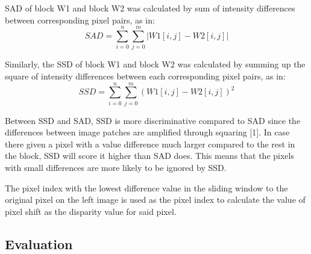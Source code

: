 \documentclass[conference]{IEEEtran}
\begin{document}
SAD of block W1 and block W2 was calculated by sum of intensity differences between corresponding pixel pairs, as in:
\begin{equation*}
    SAD=\sum^{n}_{i=0}\sum^{m}_{j=0}|W1[i,j]-W2[i,j]|
\end{equation*}

Similarly, the SSD of block W1 and block W2 was calculated by summing up the square of intensity differences between each corresponding pixel pairs, as in:
\begin{equation*}
    SSD=\sum^{n}_{i=0}\sum^{m}_{j=0}(W1[i,j]-W2[i,j])^2
\end{equation*}

Between SSD and SAD, SSD is more discriminative compared to SAD since the differences between image patches are amplified through squaring [1]. In case there given a pixel with a value difference much larger compared to the rest in the block, SSD will score it higher than SAD does. This means that the pixels with small differences are more likely to be ignored by SSD.

The pixel index with the lowest difference value in the sliding window to the original pixel on the left image is used as the pixel index to calculate the value of pixel shift as the disparity value for said pixel.
\subsection{Evaluation}
\end{document}
